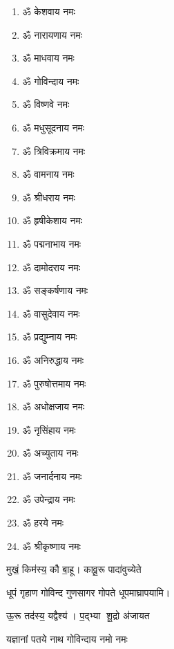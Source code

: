 \begin{center}
\begin{multicols}{2}
\begin{enumerate}
\item ॐ केशवाय नमः
\item ॐ नारायणाय नमः
\item ॐ माधवाय नमः
\item ॐ गोविन्दाय नमः
\item ॐ विष्णवे नमः 
\item ॐ मधुसूदनाय नमः
\item ॐ त्रिविक्रमाय नमः
\item ॐ वामनाय नमः
\item ॐ श्रीधराय नमः
\item ॐ हृषीकेशाय नमः
\item ॐ पद्मनाभाय नमः
\item ॐ दामोदराय नमः
\item ॐ सङ्कर्षणाय नमः
\item ॐ वासुदेवाय नमः
\item ॐ प्रद्युम्नाय नमः
\item ॐ अनिरुद्धाय नमः
\item ॐ पुरुषोत्तमाय नमः
\item ॐ अधोक्षजाय नमः
\item ॐ नृसिंहाय नमः
\item ॐ अच्युताय नमः
\item ॐ जनार्दनाय नमः
\item ॐ उपेन्द्राय नमः 
\item ॐ हरये नमः
\item ॐ श्रीकृष्णाय नमः
\end{enumerate}
\end{multicols}

\begingroup
\centering
\setlength{\columnseprule}{1pt}
\let\chapt\sect
\needspace{6em}

\endgroup


{मुखं॒ किम॑स्य॒ कौ बा॒हू। कावू॒रू पादा॑वुच्येते}

{धूपं गृहाण गोविन्द गुणसागर गोपते}
\devAya{} धूपमाघ्रापयामि।\medskip

{ऊ॒रू तद॑स्य॒ यद्वैश्य॑। प॒द्भ्या शू॒द्रो अ॑जायत}

{यज्ञानां पतये नाथ गोविन्दाय नमो नमः}


\end{center}
